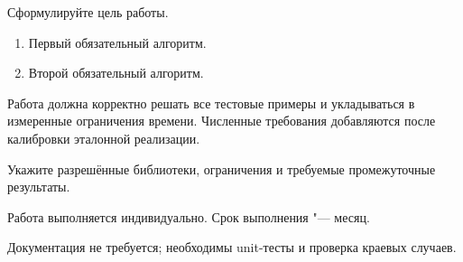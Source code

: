 \documentclass{ca-capstone}
\begin{document}

\goal
Сформулируйте цель работы.

\functionality
\begin{enumerate}
  \item Первый обязательный алгоритм.
  \item Второй обязательный алгоритм.
\end{enumerate}

\requirements
Работа должна корректно решать все тестовые примеры и укладываться в измеренные ограничения
времени. Численные требования добавляются после калибровки эталонной реализации.

\details
Укажите разрешённые библиотеки, ограничения и требуемые промежуточные результаты.

\schedule
Работа выполняется индивидуально. Срок выполнения "--- месяц.

\remarks
Документация не требуется; необходимы unit-тесты и проверка краевых случаев.

\end{document}
